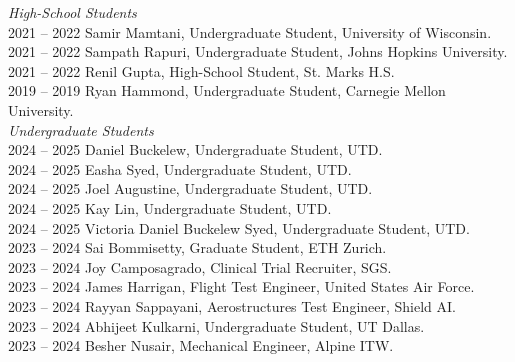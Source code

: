 
\textit{High-School Students} \\
2021 -- 2022 \hspace{28pt} Samir Mamtani, Undergraduate Student, University of Wisconsin. \\
2021 -- 2022 \hspace{28pt} Sampath Rapuri, Undergraduate Student, Johns Hopkins University. \\
2021 -- 2022 \hspace{28pt} Renil Gupta, High-School Student, St. Marks H.S. \\
2019 -- 2019 \hspace{28pt} Ryan Hammond, Undergraduate Student, Carnegie Mellon University. \\

\textit{Undergraduate Students} \\
2024 -- 2025 \hspace{28pt} Daniel Buckelew, Undergraduate Student, UTD. \\
2024 -- 2025 \hspace{28pt} Easha Syed, Undergraduate Student, UTD. \\
2024 -- 2025 \hspace{28pt} Joel Augustine, Undergraduate Student, UTD. \\
2024 -- 2025 \hspace{28pt} Kay Lin, Undergraduate Student, UTD. \\
2024 -- 2025 \hspace{28pt} Victoria Daniel Buckelew Syed, Undergraduate Student, UTD. \\
2023 -- 2024 \hspace{28pt} Sai Bommisetty, Graduate Student, ETH Zurich. \\
2023 -- 2024 \hspace{28pt} Joy Camposagrado, Clinical Trial Recruiter, SGS. \\
2023 -- 2024 \hspace{28pt} James Harrigan, Flight Test Engineer, United States Air Force. \\
2023 -- 2024 \hspace{28pt} Rayyan Sappayani, Aerostructures Test Engineer, Shield AI. \\
2023 -- 2024 \hspace{28pt} Abhijeet Kulkarni, Undergraduate Student, UT Dallas. \\
2023 -- 2024 \hspace{28pt} Besher Nusair, Mechanical Engineer, Alpine ITW. \\
